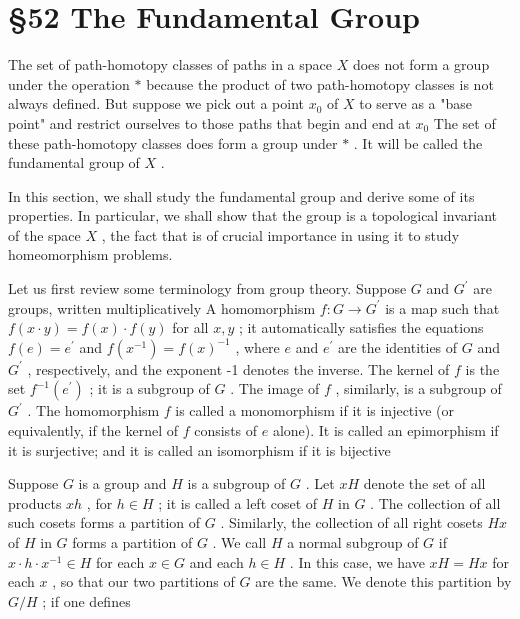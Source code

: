\section*{§52 The Fundamental Group}

The set of path-homotopy classes of paths in a space \(X\) does not form a group under the operation \(*\) because the product of two path-homotopy classes is not always defined. But suppose we pick out a point \({x}_{0}\) of \(X\) to serve as a "base point" and restrict ourselves to those paths that begin and end at \({x}_{0}\) The set of these path-homotopy classes does form a group under \(*\) . It will be called the fundamental group of \(X\) .

In this section, we shall study the fundamental group and derive some of its properties. In particular, we shall show that the group is a topological invariant of the space \(X\) , the fact that is of crucial importance in using it to study homeomorphism problems.

Let us first review some terminology from group theory. Suppose \(G\) and \({G}^{\prime }\) are groups, written multiplicatively A homomorphism \(f : G \rightarrow  {G}^{\prime }\) is a map such that \(f\left( {x \cdot  y}\right)  = f\left( x\right)  \cdot  f\left( y\right)\) for all \(x,y\) ; it automatically satisfies the equations \(f\left( e\right)  = {e}^{\prime }\) and \(f\left( {x}^{-1}\right)  = f{\left( x\right) }^{-1}\) , where \(e\) and \({e}^{\prime }\) are the identities of \(G\) and \({G}^{\prime }\) , respectively, and the exponent -1 denotes the inverse. The kernel of \(f\) is the set \({f}^{-1}\left( {e}^{\prime }\right)\) ; it is a subgroup of \(G\) . The image of \(f\) , similarly, is a subgroup of \({G}^{\prime }\) . The homomorphism \(f\) is called a monomorphism if it is injective (or equivalently, if the kernel of \(f\) consists of \(e\) alone). It is called an epimorphism if it is surjective; and it is called an isomorphism if it is bijective

Suppose \(G\) is a group and \(H\) is a subgroup of \(G\) . Let \({xH}\) denote the set of all products \({xh}\) , for \(h \in  H\) ; it is called a left coset of \(H\) in \(G\) . The collection of all such cosets forms a partition of \(G\) . Similarly, the collection of all right cosets \({Hx}\) of \(H\) in \(G\) forms a partition of \(G\) . We call \(H\) a normal subgroup of \(G\) if \(x \cdot  h \cdot  {x}^{-1} \in  H\) for each \(x \in  G\) and each \(h \in  H\) . In this case, we have \({xH} = {Hx}\) for each \(x\) , so that our two partitions of \(G\) are the same. We denote this partition by \(G/H\) ; if one defines

